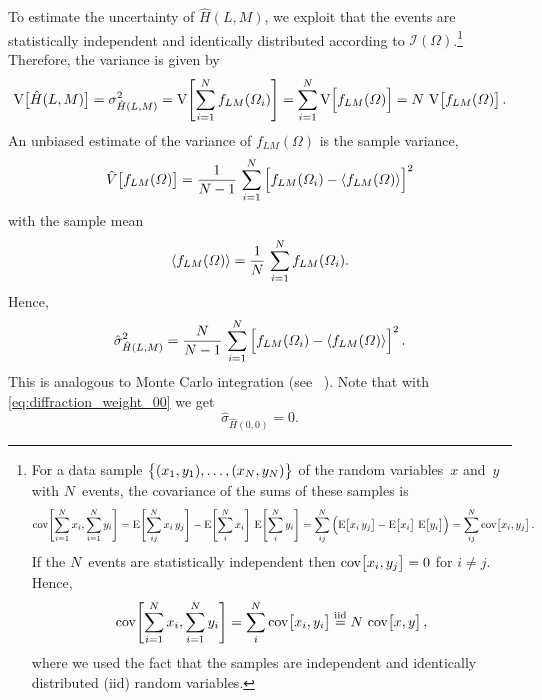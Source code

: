 To estimate the uncertainty of $\hat{H}(L, M)$, we exploit that the
events are statistically independent and identically distributed
according to $\mathcal{I}(\Omega)$.\footnote{%
  For a data sample $\cBrk{(x_1, y_1), \ldots, (x_N, y_N)}$ of the
  random variables~$x$ and~$y$ with $N$~events, the covariance of the
  sums of these samples is
  \begin{equation}
    \cov[4]{\sum_{i = 1}^N x_i, \sum_{i = 1}^N y_i}
    = \exptVal[4]{\sum_{i j}^N x_i\, y_j} - \exptVal[4]{\sum_i^N x_i}\, \exptVal[4]{\sum_i^N y_i}
    = \sum_{i j}^N \rBrk[2]{\exptVal[1]{x_i\, y_j} - \exptVal[1]{x_i}\, \exptVal[1]{y_i}}
    = \sum_{i j}^N \cov[1]{x_i, y_j}.
  \end{equation}
  If the $N$~events are statistically independent then $\cov[1]{x_i,
  y_j} = 0$ for $i \neq j$.  Hence,
  \begin{equation}
    \cov[4]{\sum_{i = 1}^N x_i, \sum_{i = 1}^N y_i}
    = \sum_i^N \cov[1]{x_i, y_i}
    \equalUsing{\text{iid}} N\, \cov[1]{x, y},
  \end{equation}
  where we used the fact that the samples are independent and
  identically distributed (iid) random variables.
}  Therefore, the variance is given by
\begin{equation}
  \label{eq:moments_diffraction_var}
  \var[1]{\hat{H}(L, M)}
  = \sigma_{\hat{H}(L, M)}^2
  = \var[4]{\sum_{i = 1}^N f_{L M}(\Omega_i)}
  = \sum_{i = 1}^N \var[2]{f_{L M}(\Omega)}
  = N\, \var[1]{f_{L M}(\Omega)}.
\end{equation}
An unbiased estimate of the variance of $f_{L M}(\Omega)$ is the
sample variance, \ie
\begin{equation}
  \hat{V}\!\sBrk[1]{f_{L M}(\Omega)}
  = \frac{1}{N - 1}\, \sum_{i = 1}^N \sBrk[2]{f_{L M}(\Omega_i) - \mean{f_{L M}(\Omega)}}^2
\end{equation}
with the sample mean
\begin{equation}
  \langle{f_{L M}(\Omega)}\rangle
  = \frac{1}{N}\, \sum_{i = 1}^N f_{L M}(\Omega_i).
\end{equation}
Hence,
\begin{equation}
  \label{eq:moments_diffraction_stdDev}
  \hat{\sigma}_{\hat{H}(L, M)}^2
  = \frac{N}{N - 1}\, \sum_{i = 1}^N \sBrk[2]{f_{L M}(\Omega_i) - \mean{f_{L M}(\Omega)}}^2.
\end{equation}
This is analogous to Monte Carlo integration (see \eg\
).  Note that with
\cref{eq:diffraction_weight_00} we get
\begin{equation}
  \hat{\sigma}_{\hat{H}(0, 0)}
  = 0.
\end{equation}

